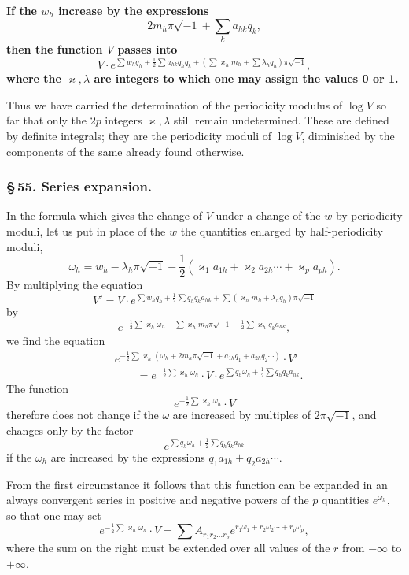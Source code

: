 \documentclass[10pt]{article}
\begin{document}
\textbf{If the \(w_h\) increase by the expressions}
\[
2m_h\pi\sqrt{-1}+\sum_k a_{hk}q_k,
\]
\textbf{then the function \(V\) passes into}
\[
V\cdot e^{\sum w_hq_h+\frac12\sum a_{hk}q_hq_k+(\sum\varkappa_hm_h+\sum\lambda_hq_h)\pi\sqrt{-1}},
\]
\textbf{where the \(\varkappa,\lambda\) are integers to which one may assign the values 0 or 1.}

Thus we have carried the determination of the periodicity modulus of \(\log V\) so far that only the \(2p\) integers \(\varkappa,\lambda\) still remain undetermined. These are defined by definite integrals; they are the periodicity moduli of \(\log V\), diminished by the components of the same already found otherwise.

\subsubsection*{\S\,55. Series expansion.}

In the formula which gives the change of \(V\) under a change of the \(w\) by periodicity moduli, let us put in place of the \(w\) the quantities enlarged by half-periodicity moduli,
\[
\tag{1}\omega_h=w_h-\lambda_h\pi\sqrt{-1}-\frac12(\varkappa_1a_{1h}+\varkappa_2a_{2h}\cdots+\varkappa_pa_{ph}).
\]
By multiplying the equation
\[
V'=V\cdot e^{\sum w_hq_h+\frac12\sum q_hq_ka_{hk}+\sum(\varkappa_hm_h+\lambda_hq_h)\pi\sqrt{-1}}
\]
by
\[
e^{-\frac12\sum\varkappa_h\omega_h-\sum\varkappa_hm_h\pi\sqrt{-1}-\frac12\sum\varkappa_hq_ka_{hk}},
\]
we find the equation
\[
\begin{aligned}
&e^{-\frac12\sum\varkappa_h(\omega_h+2m_h\pi\sqrt{-1}+a_{1h}q_1+a_{2h}q_2\cdots)}\cdot V'\\
&\qquad=e^{-\frac12\sum\varkappa_h\omega_h}\cdot V\cdot e^{\sum q_h\omega_h+\frac12\sum q_hq_ka_{hk}}.
\end{aligned}
\]
The function
\[
e^{-\frac12\sum\varkappa_h\omega_h}\cdot V
\]
therefore does not change if the \(\omega\) are increased by multiples of \(2\pi\sqrt{-1}\), and changes only by the factor
\[
e^{\sum q_h\omega_h+\frac12\sum q_hq_ka_{hk}}
\]
if the \(\omega_h\) are increased by the expressions \(q_1a_{1h}+q_2a_{2h}\cdots\).

From the first circumstance it follows that this function can be expanded in an always convergent series in positive and negative powers of the \(p\) quantities \(e^{\omega_h}\), so that one may set
\[
e^{-\frac12\sum\varkappa_h\omega_h}\cdot V=\sum A_{r_1r_2\ldots r_p}e^{r_1\omega_1+r_2\omega_2\cdots+r_p\omega_p},
\]
where the sum on the right must be extended over all values of the \(r\) from \(-\infty\) to \(+\infty\).
\end{document}
